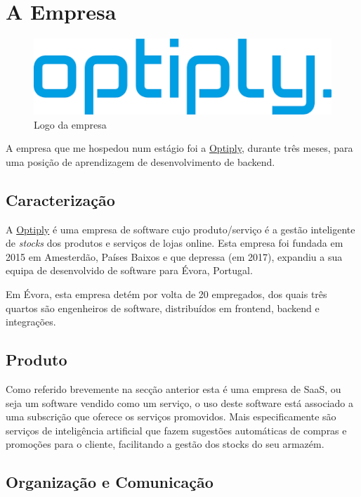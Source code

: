\chapter{A Empresa}\label{cap2}

\begin{figure}[!hbt]
  \centering
  \includegraphics[width=12cm]{figuras/optiply_logo.png}
  \caption{Logo da empresa}
  \label{fig:logo}
\end{figure}
\FloatBarrier

A empresa que me hospedou num estágio foi a \href{https://optiply.nl/}{Optiply}, durante três meses, para uma posição de aprendizagem de desenvolvimento de backend.

\section{Caracterização}

A \href{https://optiply.nl/}{Optiply} é uma empresa de software cujo produto/serviço é a gestão inteligente de \textit{stocks} dos produtos e serviços de lojas online. Esta empresa foi fundada em 2015 em Amesterdão, Países Baixos e que depressa (em 2017), expandiu a sua equipa de desenvolvido de software para Évora, Portugal.

Em Évora, esta empresa detém por volta de 20 empregados, dos quais três quartos são engenheiros de software, distribuídos em frontend, backend e integrações.

\section{Produto}

Como referido brevemente na secção anterior esta é uma empresa de SaaS, ou seja um software vendido como um serviço, o uso deste software está associado a uma subscrição que oferece os serviços promovidos. Mais especificamente são serviços de inteligência artificial que fazem sugestões automáticas de compras e promoções para o cliente, facilitando a gestão dos stocks do seu armazém.

\newpage

\section{Organização e Comunicação}

